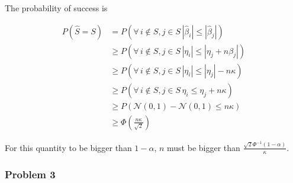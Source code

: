 \documentclass[12pt]{article}
\newcommand{\Q}[1]{\subsubsection*{Problem #1}}
\begin{document}
The probability of success is

\begin{align*}
P(\hat S = S) &= P(\forall \, i \not \in S, j \in S \, |\hat \beta_i| \le |\hat \beta_j|) 
\\&\ge P(\forall \, i \not \in S, j \in S \, |\eta_i| \le |\eta_j + n \beta_j|)
\\&\ge P(\forall \, i \not \in S, j \in S \, |\eta_i| \le |\eta_j| - n \kappa)
\\&\ge P(\forall \, i \not \in S, j \in S \, \eta_i \le \eta_j + n \kappa)
\\&\ge P(\mathcal N(0, 1) - \mathcal N(0, 1) \leq n \kappa)
\\&\ge \Phi(\frac{n \kappa}{\sqrt 2})
\end{align*}

For this quantity to be bigger than $1 - \alpha$, $n$ must be bigger than $\frac{\sqrt 2 \Phi^{-1}(1 - \alpha)}{\kappa}$.

\Q{3}
\end{document}
